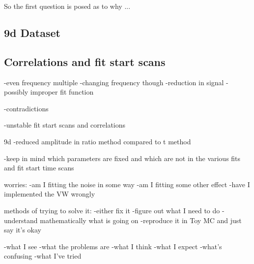 \documentclass[12pt,letterpaper]{report}
\begin{document}
So the first question is posed as to why ... 





\subsection*{9d Dataset}



\subsection*{Correlations and fit start scans}





-even frequency multiple
-changing frequency though
-reduction in signal
-possibly improper fit function

-contradictions


-unstable fit start scans and correlations


9d
-reduced amplitude in ratio method compared to t method


-keep in mind which parameters are fixed and which are not in the various fits and fit start time scans



worries:
-am I fitting the noise in some way
-am I fitting some other effect
-have I implemented the VW wrongly




methods of trying to solve it:
-either fix it
-figure out what I need to do
-understand mathematically what is going on
-reproduce it in Toy MC and just say it's okay








-what I see
-what the problems are
-what I think
-what I expect
-what's confusing
-what I've tried








\end{document}
